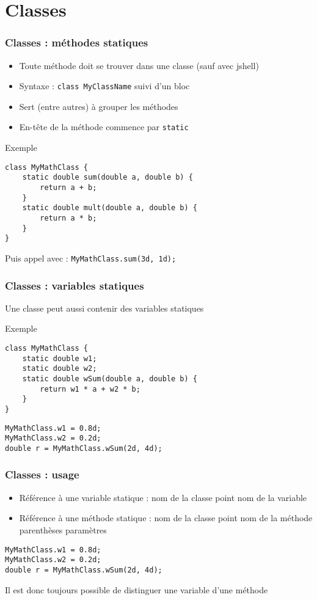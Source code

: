\documentclass[english, french]{beamer}
\begin{document}
\section{Classes}
\begin{frame}[fragile]
	\frametitle{Classes : méthodes statiques}
	\begin{itemize}
		\item Toute méthode doit se trouver dans une classe {\tiny (sauf avec jshell)}
		\item Syntaxe : \texttt{class MyClassName} suivi d’un bloc
		\item Sert (entre autres) à grouper les méthodes
		\item En-tête de la méthode commence par \texttt{static}
	\end{itemize}
	\begin{block}{Exemple}
		\vspace{-0.5ex}
		\begin{lstlisting}
class MyMathClass {
	static double sum(double a, double b) {
		return a + b;
	}
	static double mult(double a, double b) {
		return a * b;
	}
}
		\end{lstlisting}	
	\end{block}
	Puis appel avec : \texttt{MyMathClass.sum(3d, 1d);}
\end{frame}

\begin{frame}[fragile]
	\frametitle{Classes : variables statiques}
	Une classe peut aussi contenir des variables statiques
	\begin{block}{Exemple}
		\begin{lstlisting}
class MyMathClass {
	static double w1;
	static double w2;
	static double wSum(double a, double b) {
		return w1 * a + w2 * b;
	}
}
		\end{lstlisting}	
	\end{block}
	\begin{lstlisting}
MyMathClass.w1 = 0.8d;
MyMathClass.w2 = 0.2d;
double r = MyMathClass.wSum(2d, 4d);
	\end{lstlisting}
\end{frame}

\begin{frame}[fragile]
	\frametitle{Classes : usage}
	\begin{itemize}
		\item Référence à une variable statique : nom de la classe point nom de la variable
		\item Référence à une méthode statique : nom de la classe point nom de la méthode parenthèses paramètres
	\end{itemize}
	\begin{lstlisting}
MyMathClass.w1 = 0.8d;
MyMathClass.w2 = 0.2d;
double r = MyMathClass.wSum(2d, 4d);
	\end{lstlisting}
	Il est donc toujours possible de distinguer une variable d’une méthode
\end{frame}
	
\end{document}
